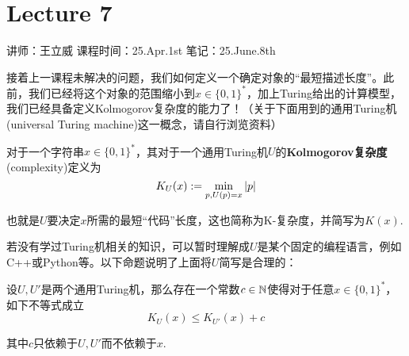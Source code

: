 \chapter{Lecture 7}

\begin{center}
    讲师：王立威 \qquad
    课程时间：25.Apr.1st \qquad 
    笔记：25.June.8th
\end{center}

\bigskip

接着上一课程未解决的问题，我们如何定义一个确定对象的“最短描述长度”。此前，我们已经将这个对象的范围缩小到$x \in \{0,1\}^*$，加上Turing给出的计算模型，我们已经具备定义Kolmogorov复杂度的能力了！（关于下面用到的通用Turing机(universal Turing machine)这一概念，请自行浏览资料）
\begin{definition}[Kolmogorov复杂度]
    对于一个字符串$x \in \{0,1\}^*$，其对于一个通用Turing机$U$的\textbf{Kolmogorov复杂度}(complexity)定义为 
\[
K_U(x) := \min_{p, U(p)=x} \left\vert p\right\vert
\]

也就是$U$要决定$x$所需的最短“代码”长度，这也简称为K-复杂度，并简写为$K(x)$.
\end{definition}

若没有学过Turing机相关的知识，可以暂时理解成$U$是某个固定的编程语言，例如C++或Python等。以下命题说明了上面将$U$简写是合理的：
\begin{proposition}
    设$U, U'$是两个通用Turing机，那么存在一个常数$c \in \mathbb{N}$使得对于任意$x \in \{0, 1\}^*$，如下不等式成立 
    \[
    K_U(x) \le K_{U'}(x) + c
    \]

    其中$c$只依赖于$U,U'$而不依赖于$x$.
\end{proposition}

